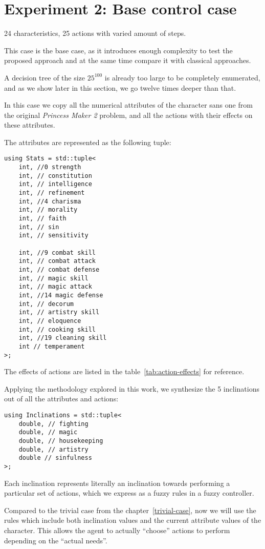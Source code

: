 \documentclass[12pt, a4paper]{report}
\begin{document}
	\chapter{Experiment 2: Base control case}\label{section::control-case}
    
	24 characteristics, 25 actions with varied amount of steps.

	This case is the base case, as it introduces enough complexity to test the proposed approach and at the same time compare it with classical approaches.

	A decision tree of the size $25^{100}$ is already too large to be completely enumerated, and as we show later in this section, we go twelve times deeper than that.

	In this case we copy all the numerical attributes of the character sans one from the original \textit{Princess Maker 2} problem, and all the actions with their effects on these attributes.
	
	The attributes are represented as the following tuple:
	
	\begin{lstlisting}
using Stats = std::tuple<
	int, //0 strength
	int, // constitution
	int, // intelligence
	int, // refinement
	int, //4 charisma
	int, // morality
	int, // faith
	int, // sin
	int, // sensitivity
	
	int, //9 combat skill
	int, // combat attack
	int, // combat defense
	int, // magic skill
	int, // magic attack
	int, //14 magic defense
	int, // decorum
	int, // artistry skill
	int, // eloquence
	int, // cooking skill
	int, //19 cleaning skill
	int // temperament
>;
	\end{lstlisting}
	
	The effects of actions are listed in the table~\ref{tab:action-effects} for reference.
	
	Applying the methodology explored in this work, we synthesize the 5 inclinations out of all the attributes and actions:
	
	\begin{lstlisting}
using Inclinations = std::tuple<
	double, // fighting
	double, // magic
	double, // housekeeping
	double, // artistry
	double // sinfulness
>;
	\end{lstlisting}
	
	Each inclination represents literally an inclination towards performing a particular set of actions, which we express as a fuzzy rules in a fuzzy controller.
	
	Compared to the trivial case from the chapter~\ref{trivial-case}, now we will use the rules which include both inclination values and the current attribute values of the character.
	This allows the agent to actually ``choose'' actions to perform depending on the ``actual needs''.
	
\end{document}
